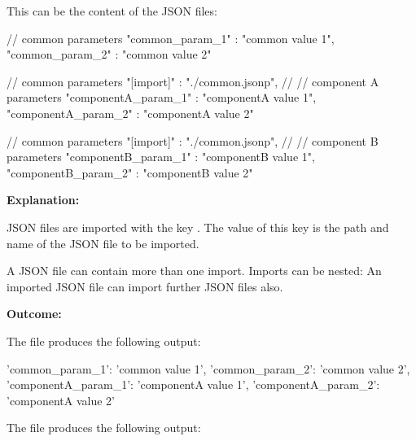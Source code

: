 \vspace{2ex}

This can be the content of the JSON files:

\vspace{2ex}

\textbullet {}

\begin{pythoncode}
{
   // common parameters
   "common_param_1" : "common value 1",
   "common_param_2" : "common value 2"
}
\end{pythoncode}

\textbullet {}

\begin{pythoncode}[linebackgroundcolor=\hlcode{3}]
{
   // common parameters
   "[import]" : "./common.jsonp",
   //
   // component A parameters
   "componentA_param_1" : "componentA value 1",
   "componentA_param_2" : "componentA value 2"
}
\end{pythoncode}

\textbullet {}

\begin{pythoncode}[linebackgroundcolor=\hlcode{3}]
{
   // common parameters
   "[import]" : "./common.jsonp",
   //
   // component B parameters
   "componentB_param_1" : "componentB value 1",
   "componentB_param_2" : "componentB value 2"
}
\end{pythoncode}

\textbf{Explanation:}

\vspace{2ex}

JSON files are imported with the key . The value of this key is the path and name of the JSON file to be imported.

A JSON file can contain more than one import. Imports can be nested: An imported JSON file can import further JSON files also.

\newpage

\textbf{Outcome:}

The file  produces the following output:

\begin{pythonlog}
{'common_param_1': 'common value 1',
 'common_param_2': 'common value 2',
 'componentA_param_1': 'componentA value 1',
 'componentA_param_2': 'componentA value 2'}
\end{pythonlog}

The file  produces the following output:

